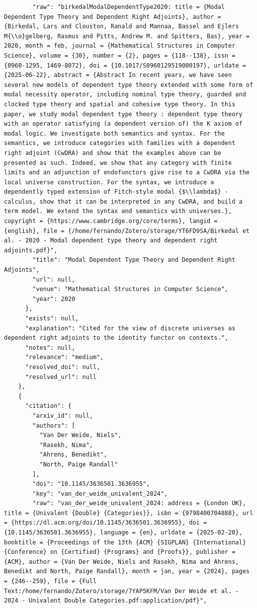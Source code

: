 \documentclass[11pt]{article}
\begin{document}
\begin{verbatim}
        "raw": "birkedalModalDependentType2020: title = {Modal Dependent Type Theory and Dependent Right Adjoints}, author = {Birkedal, Lars and Clouston, Ranald and Mannaa, Bassel and Ejlers M{\\o}gelberg, Rasmus and Pitts, Andrew M. and Spitters, Bas}, year = 2020, month = feb, journal = {Mathematical Structures in Computer Science}, volume = {30}, number = {2}, pages = {118--138}, issn = {0960-1295, 1469-8072}, doi = {10.1017/S0960129519000197}, urldate = {2025-06-22}, abstract = {Abstract In recent years, we have seen several new models of dependent type theory extended with some form of modal necessity operator, including nominal type theory, guarded and clocked type theory and spatial and cohesive type theory. In this paper, we study modal dependent type theory : dependent type theory with an operator satisfying (a dependent version of) the K axiom of modal logic. We investigate both semantics and syntax. For the semantics, we introduce categories with families with a dependent right adjoint (CwDRA) and show that the examples above can be presented as such. Indeed, we show that any category with finite limits and an adjunction of endofunctors give rise to a CwDRA via the local universe construction. For the syntax, we introduce a dependently typed extension of Fitch-style modal {$\\lambda$} -calculus, show that it can be interpreted in any CwDRA, and build a term model. We extend the syntax and semantics with universes.}, copyright = {https://www.cambridge.org/core/terms}, langid = {english}, file = {/home/fernando/Zotero/storage/YT6FD9SA/Birkedal et al. - 2020 - Modal dependent type theory and dependent right adjoints.pdf}",
        "title": "Modal Dependent Type Theory and Dependent Right Adjoints",
        "url": null,
        "venue": "Mathematical Structures in Computer Science",
        "year": 2020
      },
      "exists": null,
      "explanation": "Cited for the view of discrete universes as dependent right adjoints to the identity functor on contexts.",
      "notes": null,
      "relevance": "medium",
      "resolved_doi": null,
      "resolved_url": null
    },
    {
      "citation": {
        "arxiv_id": null,
        "authors": [
          "Van Der Weide, Niels",
          "Rasekh, Nima",
          "Ahrens, Benedikt",
          "North, Paige Randall"
        ],
        "doi": "10.1145/3636501.3636955",
        "key": "van_der_weide_univalent_2024",
        "raw": "van_der_weide_univalent_2024: address = {London UK}, title = {Univalent {Double} {Categories}}, isbn = {9798400704888}, url = {https://dl.acm.org/doi/10.1145/3636501.3636955}, doi = {10.1145/3636501.3636955}, language = {en}, urldate = {2025-02-20}, booktitle = {Proceedings of the 13th {ACM} {SIGPLAN} {International} {Conference} on {Certified} {Programs} and {Proofs}}, publisher = {ACM}, author = {Van Der Weide, Niels and Rasekh, Nima and Ahrens, Benedikt and North, Paige Randall}, month = jan, year = {2024}, pages = {246--259}, file = {Full Text:/home/fernando/Zotero/storage/7YAP5KFM/Van Der Weide et al. - 2024 - Univalent Double Categories.pdf:application/pdf}",

\end{verbatim}
\end{document}
